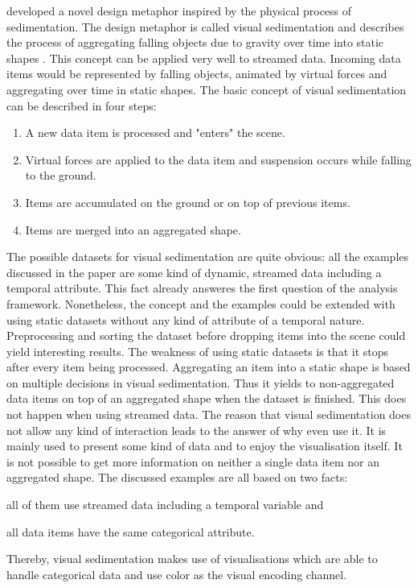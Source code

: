 \citeauthor{Huron2013} developed a novel design metaphor inspired by the physical process of sedimentation. The design metaphor is called visual sedimentation and describes the process of aggregating falling objects due to gravity over time into static shapes . This concept can be applied very well to streamed data. Incoming data items would be represented by falling objects, animated by virtual forces and aggregating over time in static shapes.
The basic concept of visual sedimentation can be described in four steps:

\begin{enumerate}
\item A new data item is processed and "enters" the scene.
\item Virtual forces are applied to the data item and suspension occurs while falling to the ground.
\item Items are accumulated on the ground or on top of previous items.
\item Items are merged into an aggregated shape.
\end{enumerate}

The possible datasets for visual sedimentation are quite obvious: all the examples discussed in the paper are some kind of dynamic, streamed data including a temporal attribute. This fact already answeres the first question of the analysis framework. Nonetheless, the concept and the examples could be extended with using static datasets without any kind of attribute of a temporal nature. Preprocessing and sorting the dataset before dropping items into the scene could yield interesting results. The weakness of using static datasets is that it stops after every item being processed. Aggregating an item into a static shape is based on multiple decisions in visual sedimentation. Thus it yields to non-aggregated data items on top of an aggregated shape when the dataset is finished. This does not happen when using streamed data.
The reason that visual sedimentation does not allow any kind of interaction leads to the answer of why even use it. It is mainly used to present some kind of data and to enjoy the visualisation itself. It is not possible to get more information on neither a single data item nor an aggregated shape.
The discussed examples are all based on two facts:
\begin{enumerate*}
\item all of them use streamed data including a temporal variable and
\item all data items have the same categorical attribute.
\end{enumerate*}
Thereby, visual sedimentation makes use of visualisations which are able to handle categorical data and use color as the visual encoding channel.

